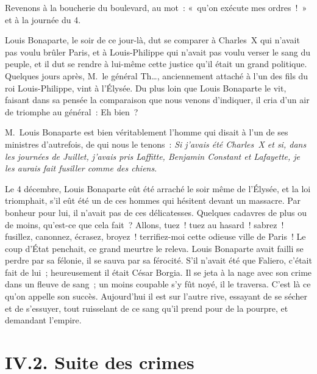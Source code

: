 \documentclass[french,twoside]{book} %
\newcommand{\astertri}{\medskip\par\centerline{\color{rubric}\large\selectfont{\syms ✻\,✻\,✻}}\medskip\par}%
\begin{document}
\astertri

\noindent Revenons à la boucherie du boulevard, au mot : « qu’on exécute mes ordres ! » et à la journée du 4.\par
Louis Bonaparte, le soir de ce jour-là, dut se comparer à Charles X qui n’avait pas voulu brûler Paris, et à Louis-Philippe qui n’avait pas voulu verser le sang du peuple, et il dut se rendre à lui-même cette justice qu’il était un grand politique. Quelques jours après, M. le général Th…, anciennement attaché à l’un des fils du roi Louis-Philippe, vint à l’Élysée. Du plus loin que Louis Bonaparte le vit, faisant dans sa pensée la comparaison que nous venons d’indiquer, il cria d’un air de triomphe au général : Eh bien ?\par
M. Louis Bonaparte est bien véritablement l’homme qui disait à l’un de ses ministres d’autrefois, de qui nous le tenons : \emph{Si j’avais été Charles X et si, dans les journées de Juillet, j’avais pris Laffitte, Benjamin Constant et Lafayette, je les aurais fait fusiller comme des chiens}.\par
Le 4 décembre, Louis Bonaparte eût été arraché le soir même de l’Élysée, et la loi triomphait, s’il eût été un de ces hommes qui hésitent devant un massacre. Par bonheur pour lui, il n’avait pas de ces délicatesses. Quelques cadavres de plus ou de moins, qu’est-ce que cela fait ? Allons, tuez ! tuez au hasard ! sabrez ! fusillez, canonnez, écrasez, broyez ! terrifiez-moi cette odieuse ville de Paris ! Le coup d’État penchait, ce grand meurtre le releva. Louis Bonaparte avait failli se perdre par sa félonie, il se sauva par sa férocité. S’il n’avait été que Faliero, c’était fait de lui ; heureusement il était César Borgia. Il se jeta à la nage avec son crime dans un fleuve de sang ; un moins coupable s’y fût noyé, il le traversa. C’est là ce qu’on appelle son succès. Aujourd’hui il est sur l’autre rive, essayant de se sécher et de s’essuyer, tout ruisselant de ce sang qu’il prend pour de la pourpre, et demandant l’empire.

\section[{IV.2. Suite des crimes}]{IV.2. Suite des crimes}
\end{document}
